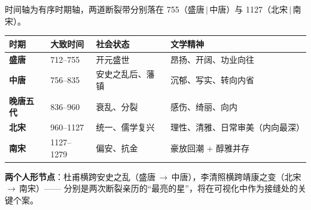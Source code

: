 时间轴为有序时期轴，两道断裂带分别落在 755（盛唐\,$\vert$\,中唐）与 1127（北宋\,$\vert$\,南宋）。

\begin{table}[H]
\centering
\renewcommand{\arraystretch}{1.3}
\begin{tabular}{>{\bfseries}l l l l}
\toprule
时期 & 大致时间 & 社会状态 & 文学精神 \\
\midrule
盛唐 & 712--755 & 开元盛世 & 昂扬、开阔、功业向往 \\
中唐 & 756--835 & 安史之乱后、藩镇 & 沉郁、写实、转向内省 \\
晚唐五代 & 836--960 & 衰乱、分裂 & 感伤、绮丽、向内 \\
北宋 & 960--1127 & 统一、儒学复兴 & 理性、清雅、日常审美（内向最深） \\
南宋 & 1127--1279 & 偏安、抗金 & 豪放回潮 + 醇雅并存 \\
\bottomrule
\end{tabular}
\end{table}

\noindent\textbf{两个人形节点}：杜甫横跨安史之乱（盛唐\,$\to$\,中唐），李清照横跨靖康之变（北宋\,$\to$\,南宋）——
分别是两次断裂亲历的“最亮的星”，将在可视化中作为接缝处的关键个案。
